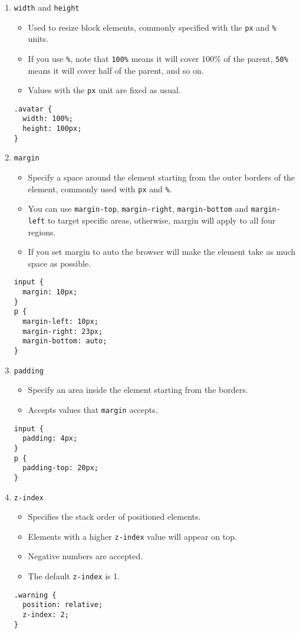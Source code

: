 \documentclass[12pt]{article}
\begin{document}
\begin{enumerate}
\item{\texttt{width} and \texttt{height}}
\begin{itemize}
    \item Used to resize block elements, commonly specified with the \texttt{px} and \texttt{\%} units.  
    \item If you use \texttt{\%}, note that \texttt{100\%} means it will cover 100\% of the parent, \texttt{50\%} means it will cover half of the parent, and so on.  
    \item Values with the \texttt{px} unit are fixed as usual.
\end{itemize}    
\begin{lstlisting}[frame=single]
.avatar {
  width: 100%;
  height: 100px;
}
\end{lstlisting}
    
\item{\texttt{margin}}
\begin{itemize}
    \item Specify a space around the element starting from the outer borders of the element, commonly used with \texttt{px} and \texttt{\%}.  
    \item You can use \texttt{margin-top}, \texttt{margin-right}, \texttt{margin-bottom} and \texttt{margin-left} to target specific areas, otherwise, margin will apply to all four regions.
    \item If you set margin to auto the browser will make the element take as much space as possible.
\end{itemize}    
\begin{lstlisting}[frame=single]
input {
  margin: 10px; 
}
p {
  margin-left: 10px;
  margin-right: 23px;
  margin-bottom: auto;
}
\end{lstlisting}
    
\item{\texttt{padding}}
\begin{itemize}
    \item Specify an area inside the element starting from the borders.
    \item Accepts values that \texttt{margin} accepts.
\end{itemize}    
\begin{lstlisting}[frame=single]
input {
  padding: 4px;
}
p {
  padding-top: 20px;
}
\end{lstlisting}
\item{\texttt{z-index}}
\begin{itemize}
    \item Specifies the stack order of positioned elements.  
    \item Elements with a higher \texttt{z-index} value will appear on top.  
    \item Negative numbers are accepted.  
    \item The default \texttt{z-index} is 1.
\end{itemize}    
\begin{lstlisting}[frame=single]
.warning {
  position: relative;
  z-index: 2;
}
\end{lstlisting}


\end{enumerate}
\end{document}
